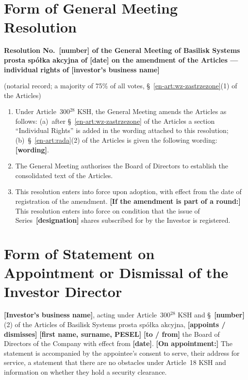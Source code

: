 \documentclass[11pt,a4paper]{report}
\newcommand{\field}[1]{\textbf{[#1]}}
\newcommand{\CompanyFull}{Basilisk Systems prosta spółka akcyjna}
\newcommand{\US}[1]{\S~#1 of the Articles}
\begin{document}
\section*{Form of General Meeting Resolution}

\textbf{Resolution No.~\field{number} of the General Meeting of \CompanyFull{} of \field{date} on the amendment of the Articles --- individual rights of \field{investor's business name}}

{\small (notarial record; a majority of 75\% of all votes, \US{\ref{en-art:wz-zastrzezone}(1)})\par}

\begin{enumerate}
  \item Under Article~300$^{28}$ KSH, the General Meeting amends the Articles as follows: (a)~after \US{\ref{en-art:wz-zastrzezone}} a section ``Individual Rights'' is added in the wording attached to this resolution; (b)~\US{\ref{en-art:rada}(2)} is given the following wording: \field{wording}.
  \item The General Meeting authorises the Board of Directors to establish the consolidated text of the Articles.
  \item This resolution enters into force upon adoption, with effect from the date of registration of the amendment. \field{If the amendment is part of a round:} This resolution enters into force on condition that the issue of Series~\field{designation} shares subscribed for by the Investor is registered.
\end{enumerate}

\section*{Form of Statement on Appointment or Dismissal of the Investor Director}

\field{Investor's business name}, acting under Article~300$^{28}$ KSH and \S~\field{number}(2) of the Articles of \CompanyFull{}, \field{appoints / dismisses} \field{first name, surname, PESEL} \field{to / from} the Board of Directors of the Company with effect from \field{date}. \field{On appointment:} The statement is accompanied by the appointee's consent to serve, their address for service, a statement that there are no obstacles under Article~18 KSH and information on whether they hold a security clearance.
\end{document}
